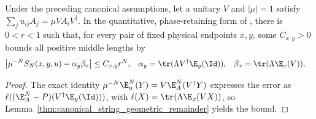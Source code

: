 \begin{lemma}
    \label{thm:physical_string_geometric_phase_error}
    \leanok
    Under the preceding canonical assumptions, let a unitary $V$ and
    $|\mu|=1$ satisfy $\sum_j u_{ij}A_j=\mu V A_iV^\dagger$.
    In the quantitative, phase-retaining form of
    \cite[lines~249--255]{PerezGarcia2008StringOrder}, there is $0<r<1$ such
    that, for every pair of fixed physical endpoints $x,y$, some $C_{x,y}>0$
    bounds all positive middle lengths by
    \begin{align}
        \big|\mu^{-N}S_N(x,y,u)-\alpha_y\beta_x\big|
                 & \leq C_{x,y}r^N,                  &
        \alpha_y & =\tr(\Lambda V^\dagger\E_y(\Id)), &
        \beta_x  & =\tr(\Lambda\E_x(V)).
        \label{eq:string_geometric_phase_error}
    \end{align}
\end{lemma}
\begin{proof}
    The exact identity $\mu^{-N}\E_u^N(Y)=V\E_A^N(V^\dagger Y)$
    expresses the error as
    $\ell((\E_A^N-P)(V^\dagger\E_y(\Id)))$, with
    $\ell(X)=\tr(\Lambda\E_x(VX))$, so
    Lemma~\ref{thm:canonical_string_geometric_remainder} yields the bound.
\end{proof}

